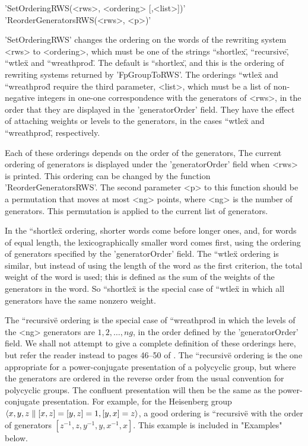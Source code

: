 'SetOrderingRWS(<rws>, <ordering> [,<list>])'\\
'ReorderGeneratorsRWS(<rws>, <p>)'

'SetOrderingRWS' changes  the ordering on  the  words of the rewriting
system  <rws>  to   <ordering>, which must  be  one    of the  strings
``shortlex\",    ``recursive\", {``wtlex\"}  and  ``wreathprod\".  The
default is ``shortlex\", and this is the ordering of rewriting systems
returned  by    'FpGroupToRWS'.   The   orderings    {``wtlex\"}   and
{``wreathprod\"} require the third parameter, <list>,  which must be a
list  of  non-negative integers  in   one-one correspondence  with the
generators of <rws>,   in the order  that they  are displayed   in the
'generatorOrder'  field. They have  the effect of attaching weights or
levels to the generators, in the cases {``wtlex\"} and ``wreathprod\",
respectively.

Each  of these orderings depends on  the order of  the generators, The
current ordering of generators is displayed under the 'generatorOrder'
field  when <rws> is  printed.  This ordering can   be changed  by the
function  'ReorderGeneratorsRWS'.  The  second  parameter <p> to  this
function should be a permutation that moves at most <ng> points, where
<ng> is  the number of generators.  This permutation is applied to the
current list of generators.

In the {``shortlex\"} ordering, shorter words come before longer ones,
and,  for words  of  equal length, the  lexicographically smaller word
comes   first, using the   ordering   of generators  specified by  the
'generatorOrder' field.  The   {``wtlex\"}  ordering is similar,   but
instead of  using the length  of the word  as the first criterion, the
total weight of the word  is used; this  is defined as  the sum of the
weights of   the generators  in  the word.   So {``shortlex\"} is  the
special   case of {``wtlex\"} in which   all  generators have the same
nonzero weight.

The {``recursive\"} ordering is  the special case  of {``wreathprod\"}
in which the levels of the <ng> generators are $1,  2, \ldots, ng$, in
the order defined by the 'generatorOrder' field.  We shall not attempt
to give  a complete definition of  these orderings here, but refer the
reader instead to pages  46--50 of \cite{Sims94}.  The {``recursive\"}
ordering is the one appropriate  for a power-conjugate presentation of
a  polycyclic  group, but  where   the generators are  ordered  in the
reverse  order from the usual  convention  for polycyclic groups.  The
confluent  presentation will then  be the  same as the power-conjugate
presentation.  For example,  for the  Heisenberg  group $\langle x,y,z
\hspace{1mm} \| \hspace{1mm}  [x,z]=[y,z]=1,  [y,x]=z \rangle  $,   a
good   ordering  is {``recursive\"}  with    the  order of  generators
$[z^{-1},z,y^{-1},y,x^{-1},x]$.   This    example is     included   in
"Examples" below.

